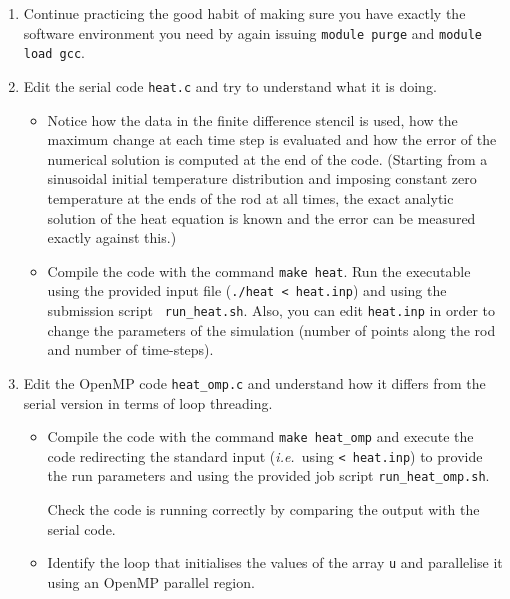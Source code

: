 \documentclass[a4paper, 12pt]{article}
\def \cc   {\tt }               %
\def \ie   {{\em i.e.\ }}
\begin{document}
\begin{enumerate}
  
  \item Continue practicing the good habit of making sure you have exactly
    the software environment you need by again issuing {\cc module purge} and
    {\cc module load gcc}. 

  \item Edit the serial code {\cc heat.c} and try to understand what it
    is doing.

    \begin{itemize}
      \item Notice how the data in the finite difference stencil is
        used, how the maximum change at each time step is evaluated
        and how the error of the numerical solution is computed at the
        end of the code.  (Starting from a sinusoidal initial
        temperature distribution and imposing constant zero
        temperature at the ends of the rod at all times, the exact
        analytic solution of the heat equation is known and the error
        can be measured exactly against this.)

      \item Compile the code with the command {\cc make heat}.  Run
        the executable using the provided input file ({\cc ./heat <
          heat.inp}) and using the submission script {\cc
          run\_heat.sh}.  Also, you can edit {\cc heat.inp} in order to
        change the parameters of the simulation (number of points
        along the rod and number of time-steps).
    \end{itemize}

  \item Edit the OpenMP code {\cc heat\_omp.c} and understand how it differs from the
    serial version in terms of loop threading.

    \begin{itemize}
      \item Compile the code with the command {\cc make heat\_omp} and
        execute the code redirecting the standard input (\ie using
        {\cc < heat.inp}) to provide the run parameters and using the
        provided job script {\cc run\_heat\_omp.sh}.

        Check the code is running correctly by comparing the output with the serial code.

      \item Identify the loop that initialises the values of the array
        {\cc u} and parallelise it using an OpenMP parallel region.


\end{itemize}
\end{enumerate}
\end{document}
